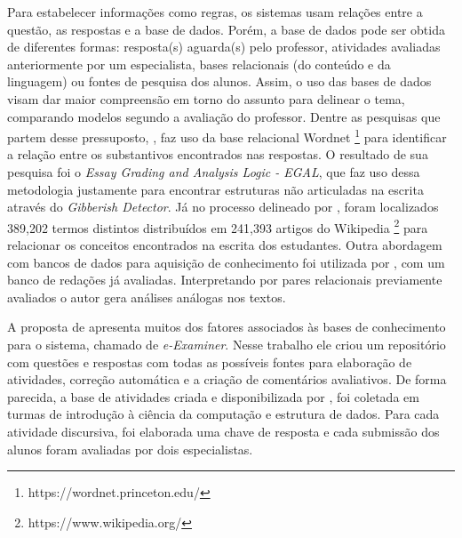 Para estabelecer informações como regras, os sistemas usam relações entre a questão, as respostas e a base de dados. Porém, a base de dados pode ser obtida de diferentes formas: resposta(s) aguarda(s) pelo professor, atividades avaliadas anteriormente por um especialista, bases relacionais (do conteúdo e da linguagem) ou fontes de pesquisa dos alunos. Assim, o uso das bases de dados visam dar maior compreensão em torno do assunto para delinear o tema, comparando modelos segundo a avaliação do professor. Dentre as pesquisas que partem desse pressuposto, , faz uso da base relacional Wordnet \footnote{https://wordnet.princeton.edu/} para identificar a relação entre os substantivos encontrados nas respostas. O resultado de sua pesquisa foi o \textit{Essay Grading and Analysis Logic - EGAL}, que faz uso dessa metodologia justamente para encontrar estruturas não articuladas na escrita através do \textit{Gibberish Detector}. Já no processo delineado por , foram localizados 389,202 termos distintos distribuídos em 241,393 artigos do Wikipedia \footnote{https://www.wikipedia.org/} para relacionar os conceitos encontrados na escrita dos estudantes. Outra abordagem com bancos de dados para aquisição de conhecimento foi utilizada por , com um banco de redações já avaliadas. Interpretando por pares relacionais previamente avaliados o autor gera análises análogas nos textos.

A proposta de  apresenta muitos dos fatores associados às bases de conhecimento para o sistema, chamado de \textit{e-Examiner}. Nesse trabalho ele criou um repositório com questões e respostas com todas as possíveis fontes para elaboração de atividades, correção automática e a criação de comentários avaliativos. De forma parecida, a base de atividades criada e disponibilizada por , foi coletada em turmas de introdução à ciência da computação e estrutura de dados. Para cada atividade discursiva, foi elaborada uma chave de resposta e cada submissão dos alunos foram avaliadas por dois especialistas.

